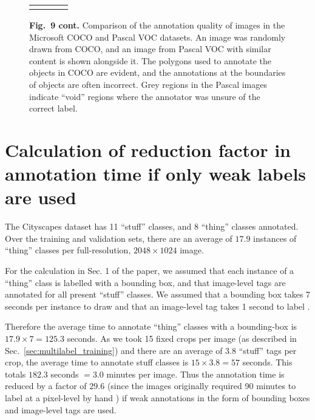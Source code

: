\documentclass[runningheads]{llncs}
\begin{document}
\begin{figure}[!t]
\begin{tabularx}{\linewidth}{ Y Y Y Y }
\textcolor{white}{} \\

\end{tabularx}
\textbf{Fig.~9 cont.} Comparison of the annotation quality of images in the Microsoft COCO and Pascal VOC datasets. An image was randomly drawn from COCO, and an image from Pascal VOC with similar content is shown alongside it.
The polygons used to annotate the objects in COCO are evident, and the annotations at the boundaries of objects are often incorrect.
Grey regions in the Pascal images indicate ``void'' regions where the annotator was unsure of the correct label.
\label{fig:voc_vs_coco2}
\end{figure}
  \section{Calculation of reduction factor in annotation time if only weak labels are used}
\label{sec:annotation_time}

The Cityscapes dataset has 11 ``stuff'' classes, and 8 ``thing'' classes annotated.
Over the training and validation sets, there are an average of $17.9$ instances of ``thing'' classes per full-resolution, $2048 \times 1024$ image.

For the calculation in Sec. 1 of the paper, we assumed that each instance of a ``thing'' class is labelled with a bounding box, and that image-level tags are annotated for all present ``stuff'' classes.
We assumed that a bounding box takes 7 seconds per instance to draw \cite{papadopoulos_iccv_2017} and that an image-level tag takes 1 second to label \cite{papadopoulos_eccv_2014}.

Therefore the average time to annotate ``thing'' classes with a bounding-box is $17.9 \times 7 = 125.3$ seconds.
As we took 15 fixed crops per image (as described in Sec.~\ref{sec:multilabel_training}) and there are an average of 3.8 ``stuff'' tags per crop, the average time to annotate stuff classes is $15 \times 3.8 = 57$ seconds.
This totals $182.3 $ seconds $= 3.0 $ minutes per image.
Thus the annotation time is reduced by a factor of $29.6$ (since the images originally required 90 minutes to label at a pixel-level by hand \cite{cordts_cvpr_2016}) if weak annotations in the form of bounding boxes and image-level tags are used. 
\end{document}
